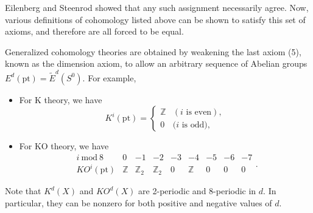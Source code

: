 \documentclass[12pt]{article}
\numberwithin{equation}{section}
\numberwithin{figure}{section}
\theoremstyle{remark}
\def\bZ{\mathbb{Z}}
\def\pt{\mathrm{pt}}
\begin{document}
Eilenberg and Steenrod showed that any such assignment necessarily agree.
Now, various definitions of cohomology listed above can be shown to satisfy this set of axioms, 
and therefore are all forced to be equal.

Generalized cohomology theories are obtained by  weakening the last axiom (5), known as the dimension axiom,
to allow an arbitrary sequence of Abelian groups $E^d(\pt)=\tilde E^d(S^0)$.
For example, \begin{itemize}
\item For K theory, we have \begin{equation}
K^i(\pt)=\begin{cases}
\bZ & (\text{$i$ is even}),\\
0& (\text{$i$ is odd)},
\end{cases}
\end{equation}
\item For KO theory, we have \begin{equation}
\begin{array}{c|cccccccccccc}
i\ \text{mod}\ 8 & 0 & -1 & -2 & -3 & -4 & -5 & -6 & -7\\
\hline
KO^i(\pt) & \bZ & \bZ_2 & \bZ_2 & 0 & \bZ & 0 & 0 & 0 
\end{array}.
\end{equation}
\end{itemize}
Note that $K^d(X)$ and $KO^d(X)$ are 2-periodic and 8-periodic in $d$.
In particular, they can be nonzero for both positive and negative values of $d$.
\end{document}
